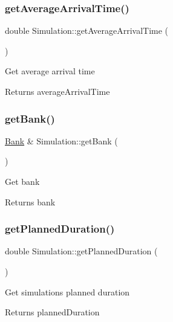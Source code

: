 \subsubsection{\texorpdfstring{get\+Average\+Arrival\+Time()}{getAverageArrivalTime()}}
{\footnotesize\ttfamily double Simulation\+::get\+Average\+Arrival\+Time (\begin{DoxyParamCaption}{ }\end{DoxyParamCaption})}

Get average arrival time \begin{DoxyReturn}{Returns}
average\+Arrival\+Time 
\end{DoxyReturn}
\mbox{\label{classSimulation_a280ef124f9f6395a446b36a9dd45e4bc}} 
\subsubsection{\texorpdfstring{get\+Bank()}{getBank()}}
{\footnotesize\ttfamily \hyperlink{classBank}{Bank} \& Simulation\+::get\+Bank (\begin{DoxyParamCaption}{ }\end{DoxyParamCaption})}

Get bank \begin{DoxyReturn}{Returns}
bank 
\end{DoxyReturn}
\mbox{\label{classSimulation_a242c58ccefca3705bdc47ee7827c24fe}} 
\subsubsection{\texorpdfstring{get\+Planned\+Duration()}{getPlannedDuration()}}
{\footnotesize\ttfamily double Simulation\+::get\+Planned\+Duration (\begin{DoxyParamCaption}{ }\end{DoxyParamCaption})}

Get simulation\textquotesingle{}s planned duration \begin{DoxyReturn}{Returns}
planned\+Duration 
\end{DoxyReturn}
\mbox{\label{classSimulation_a18218154310af27c087def0936690346}} 
